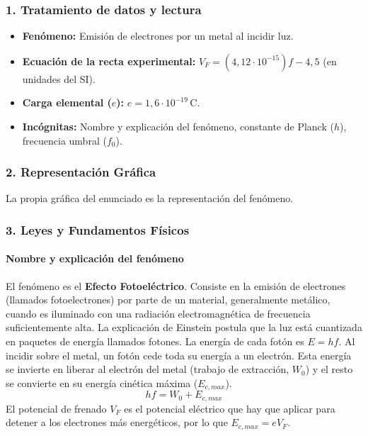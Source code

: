 \subsubsection*{1. Tratamiento de datos y lectura}
\begin{itemize}
    \item \textbf{Fenómeno:} Emisión de electrones por un metal al incidir luz.
    \item \textbf{Ecuación de la recta experimental:} $V_F = (4,12\cdot10^{-15})f - 4,5$ (en unidades del SI).
    \item \textbf{Carga elemental ($e$):} $e=1,6\cdot10^{-19}\,\text{C}$.
    \item \textbf{Incógnitas:} Nombre y explicación del fenómeno, constante de Planck ($h$), frecuencia umbral ($f_0$).
\end{itemize}

\subsubsection*{2. Representación Gráfica}
La propia gráfica del enunciado es la representación del fenómeno.

\subsubsection*{3. Leyes y Fundamentos Físicos}
\paragraph*{Nombre y explicación del fenómeno}
El fenómeno es el \textbf{Efecto Fotoeléctrico}. Consiste en la emisión de electrones (llamados fotoelectrones) por parte de un material, generalmente metálico, cuando es iluminado con una radiación electromagnética de frecuencia suficientemente alta. La explicación de Einstein postula que la luz está cuantizada en paquetes de energía llamados fotones. La energía de cada fotón es $E=hf$. Al incidir sobre el metal, un fotón cede toda su energía a un electrón. Esta energía se invierte en liberar al electrón del metal (trabajo de extracción, $W_0$) y el resto se convierte en su energía cinética máxima ($E_{c,max}$).
$$ hf = W_0 + E_{c,max} $$
El potencial de frenado $V_F$ es el potencial eléctrico que hay que aplicar para detener a los electrones más energéticos, por lo que $E_{c,max} = eV_F$.

